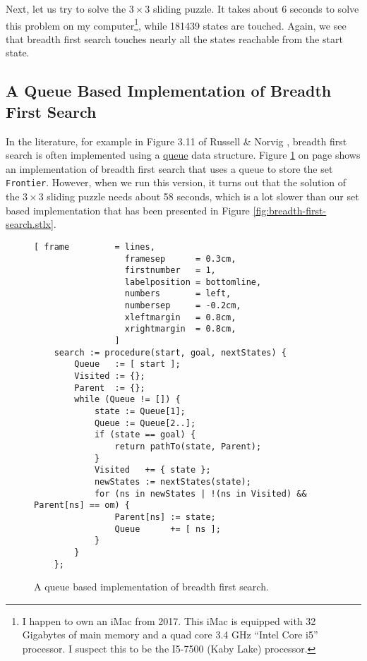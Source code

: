 Next, let us try to solve the $3 \times 3$ sliding puzzle.  It takes about 6 seconds to solve
this problem on my computer\footnote{
  I happen to own an iMac from 2017.  This iMac is equipped with 32 Gigabytes of main memory and a
  quad core 3.4 GHz ``Intel Core i5'' processor.  I suspect this to be the I5-7500 (Kaby Lake) processor.
}, while 181439 states are touched.  Again, we see that breadth first search touches nearly all the
states reachable from the start state.

\subsection{A Queue Based Implementation of Breadth First Search}
In the literature, for example in Figure 3.11 of Russell \& Norvig \cite{russell:2009}, breadth
first search is often implemented using a
\href{https://en.wikipedia.org/wiki/Queue_(abstract_data_type)}{queue} data structure.
Figure \ref{fig:breadth-first-search-queue.stlx} on page
\pageref{fig:breadth-first-search-queue.stlx} shows an implementation of breadth first search that
uses a queue to store the set \texttt{Frontier}.  However, when we run this version, it turns out
that the solution of the $3 \times 3$ sliding puzzle needs about 58 seconds, which is a lot
slower than our set based implementation that has been presented in Figure
\ref{fig:breadth-first-search.stlx}.

\begin{figure}[!ht]
\centering
\begin{Verbatim}[ frame         = lines,
                  framesep      = 0.3cm,
                  firstnumber   = 1,
                  labelposition = bottomline,
                  numbers       = left,
                  numbersep     = -0.2cm,
                  xleftmargin   = 0.8cm,
                  xrightmargin  = 0.8cm,
                ]
    search := procedure(start, goal, nextStates) {
        Queue   := [ start ];
        Visited := {};
        Parent  := {};
        while (Queue != []) {
            state := Queue[1];
            Queue := Queue[2..];
            if (state == goal) {
                return pathTo(state, Parent);
            }
            Visited   += { state };
            newStates := nextStates(state);
            for (ns in newStates | !(ns in Visited) && Parent[ns] == om) {
                Parent[ns] := state;
                Queue      += [ ns ];
            }
        }
    };
\end{Verbatim}
\vspace*{-0.3cm}
\caption{A queue based implementation of breadth first search.}
\label{fig:breadth-first-search-queue.stlx}
\end{figure}


